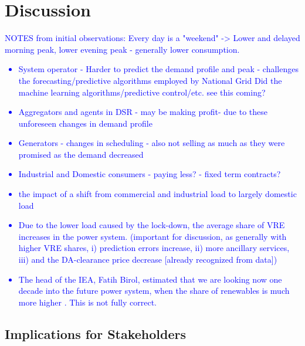 \documentclass[energies,article,submit,moreauthors,pdftex]{Definitions/mdpi}
\begin{document}

\section{Discussion}

\textcolor{blue}{
NOTES from initial observations: Every day is a "weekend" -> Lower and delayed morning peak, lower evening peak - generally lower consumption.
\begin{itemize}
    \item System operator - Harder to predict the demand profile and peak - challenges the forecasting/predictive algorithms employed by National Grid
    \subitem Did the machine learning algorithms/predictive control/etc. see this coming?
    \item Aggregators and agents in DSR - may be making profit- due to these unforeseen changes in demand profile
    \item Generators - changes in scheduling - also not selling as much as they were promised as the demand decreased
    \item Industrial and Domestic consumers - paying less? - fixed term contracts?
    \item the impact of a shift from commercial and industrial load to largely domestic load
\end{itemize}}

\textcolor{blue}{
\begin{itemize}
    \item Due to the lower load caused by the lock-down, the average share of VRE increases in the power system. (important for discussion, as generally with higher VRE shares, i) prediction errors increase, ii) more ancillary services, iii) and the DA-clearance price decrease [already recognized from data])
\end{itemize}
}

\textcolor{blue}{
\begin{itemize}
    \item The head of the IEA, Fatih Birol, estimated that we are looking now one decade into the future power system, when the share of renewables is much more higher \cite{IgorTodorovic2020Birol:Balance}. This is not fully correct.
\end{itemize}
}

\subsection{Implications for Stakeholders}
\end{document}
